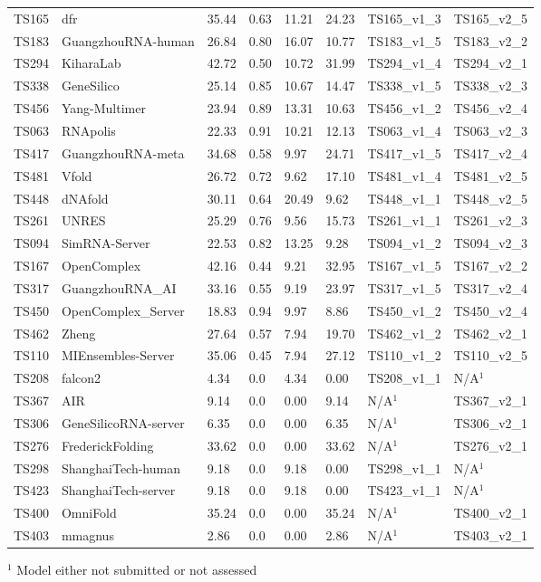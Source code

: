 \begin{table}[ht]
{\begin{tabular}{llllllll}
TS165 & dfr & 35.44 & 0.63 & 11.21 & 24.23 & TS165\_v1\_3 & TS165\_v2\_5 \\ 
TS183 & GuangzhouRNA-human & 26.84 & 0.80 & 16.07 & 10.77 & TS183\_v1\_5 & TS183\_v2\_2 \\ 
TS294 & KiharaLab & 42.72 & 0.50 & 10.72 & 31.99 & TS294\_v1\_4 & TS294\_v2\_1 \\ 
TS338 & GeneSilico & 25.14 & 0.85 & 10.67 & 14.47 & TS338\_v1\_5 & TS338\_v2\_3 \\ 
TS456 & Yang-Multimer & 23.94 & 0.89 & 13.31 & 10.63 & TS456\_v1\_2 & TS456\_v2\_4 \\ 
TS063 & RNApolis & 22.33 & 0.91 & 10.21 & 12.13 & TS063\_v1\_4 & TS063\_v2\_3 \\ 
TS417 & GuangzhouRNA-meta & 34.68 & 0.58 & 9.97 & 24.71 & TS417\_v1\_5 & TS417\_v2\_4 \\ 
TS481 & Vfold & 26.72 & 0.72 & 9.62 & 17.10 & TS481\_v1\_4 & TS481\_v2\_5 \\ 
TS448 & dNAfold & 30.11 & 0.64 & 20.49 & 9.62 & TS448\_v1\_1 & TS448\_v2\_5 \\ 
TS261 & UNRES & 25.29 & 0.76 & 9.56 & 15.73 & TS261\_v1\_1 & TS261\_v2\_3 \\ 
TS094 & SimRNA-Server & 22.53 & 0.82 & 13.25 & 9.28 & TS094\_v1\_2 & TS094\_v2\_3 \\ 
TS167 & OpenComplex & 42.16 & 0.44 & 9.21 & 32.95 & TS167\_v1\_5 & TS167\_v2\_2 \\ 
TS317 & GuangzhouRNA\_AI & 33.16 & 0.55 & 9.19 & 23.97 & TS317\_v1\_5 & TS317\_v2\_4 \\ 
TS450 & OpenComplex\_Server & 18.83 & 0.94 & 9.97 & 8.86 & TS450\_v1\_2 & TS450\_v2\_4 \\ 
TS462 & Zheng & 27.64 & 0.57 & 7.94 & 19.70 & TS462\_v1\_2 & TS462\_v2\_1 \\ 
TS110 & MIEnsembles-Server & 35.06 & 0.45 & 7.94 & 27.12 & TS110\_v1\_2 & TS110\_v2\_5 \\ 
TS208 & falcon2 & 4.34 & 0.0 & 4.34 & 0.00 & TS208\_v1\_1 & N/A$^{1}$ \\ 
TS367 & AIR & 9.14 & 0.0 & 0.00 & 9.14 & N/A$^{1}$ & TS367\_v2\_1 \\ 
TS306 & GeneSilicoRNA-server & 6.35 & 0.0 & 0.00 & 6.35 & N/A$^{1}$ & TS306\_v2\_1 \\ 
TS276 & FrederickFolding & 33.62 & 0.0 & 0.00 & 33.62 & N/A$^{1}$ & TS276\_v2\_1 \\ 
TS298 & ShanghaiTech-human & 9.18 & 0.0 & 9.18 & 0.00 & TS298\_v1\_1 & N/A$^{1}$ \\ 
TS423 & ShanghaiTech-server & 9.18 & 0.0 & 9.18 & 0.00 & TS423\_v1\_1 & N/A$^{1}$ \\ 
TS400 & OmniFold & 35.24 & 0.0 & 0.00 & 35.24 & N/A$^{1}$ & TS400\_v2\_1 \\ 
TS403 & mmagnus & 2.86 & 0.0 & 0.00 & 2.86 & N/A$^{1}$ & TS403\_v2\_1 \\ 
\bottomrule
\end{tabular}%
}
\begin{flushleft}\footnotesize $^{1}$ Model either not submitted or not assessed\end{flushleft}
\end{table}
